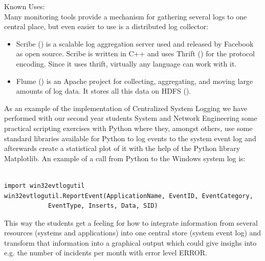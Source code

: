 Known Uses:\\
Many monitoring tools provide a mechanism for gathering several logs to one central place, but even easier to use is a distributed log collector:
\begin{itemize}
	\item Scribe (\cite{Scribe})
 is a scalable log aggregation server used and released by Facebook as open source. Scribe is written in C++ and uses Thrift (\cite{Thrift})
 for the protocol encoding. Since it uses thrift, virtually any language can work with it.
	\item Flume (\cite{Flume})
 is an Apache project for collecting, aggregating, and moving large amounts of log data. It stores all this data on HDFS (\cite{HDFS}).
\end{itemize}

As an example of the implementation of {\sc Centralized System Logging} we have performed with our second year students System and Network Engineering some practical scripting exercises with Python where they, amongst others, use some standard libraries available for Python to log events to the system event log and afterwards create a statistical plot of it with the help of the Python library Matplotlib.
An example of a call from Python to the Windows system log is:

               
\lstset{language=Python}

\begin{lstlisting}

import win32evtlogutil
win32evtlogutil.ReportEvent(ApplicationName, EventID, EventCategory,
    		EventType, Inserts, Data, SID)

\end{lstlisting}


This way the students get a feeling for how to integrate information from several resources (systems and applications) into one central store (system event log) and transform that information into a graphical output which could give insighs into e.g. the number of incidents per month with error level ERROR.




